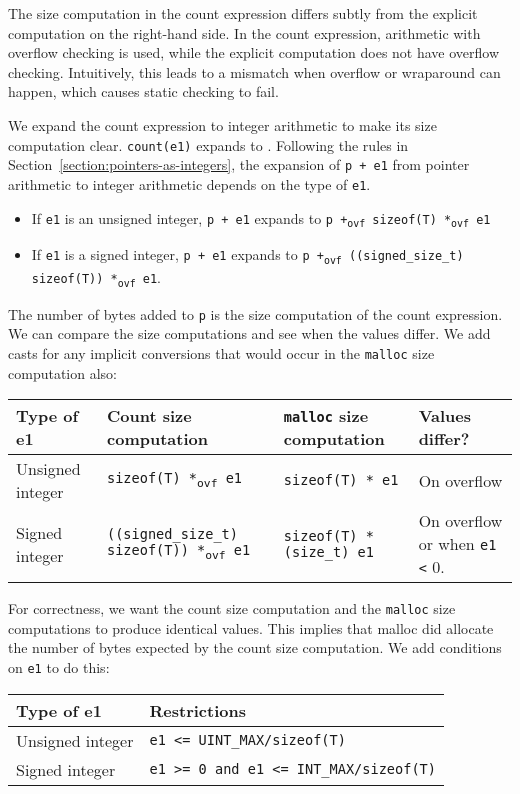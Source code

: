 The size computation in the count expression differs subtly from the
explicit computation on the right-hand side. In the count expression,
arithmetic with overflow checking is used, while the explicit
computation does not have overflow checking. Intuitively, this leads to
a mismatch when overflow or wraparound can happen, which causes static
checking to fail.

We expand the count expression to integer arithmetic to make its size
computation clear. \texttt{count(e1)} expands to . 
Following the rules in Section~\ref{section:pointers-as-integers},
the expansion of \texttt{p +
e1} from pointer arithmetic to integer arithmetic depends on the type of
\texttt{e1}.

\begin{itemize}
\item
  If \texttt{e1} is an unsigned integer, \texttt{p + e1} expands to
  \texttt{p +\textsubscript{ovf} sizeof(T) *\textsubscript{ovf} e1}
\item
  If \texttt{e1} is a signed integer, \texttt{p + e1} expands to
  \texttt{p +\textsubscript{ovf} ((signed\_size\_t) sizeof(T))
  *\textsubscript{ovf} e1}.
\end{itemize}

The number of bytes added to \texttt{p} is the size computation of the
count expression. We can compare the size computations and see when the
values differ. We add casts for any implicit conversions that would
occur in the \texttt{malloc} size computation also:

\begin{longtable}[c]{lp{1.75in}p{1.75in}p{1in}}
\toprule
Type of e1 & Count size computation & \texttt{malloc} size computation &
Values differ?\tabularnewline
\midrule
\endhead
Unsigned integer & \texttt{sizeof(T) *\textsubscript{ovf} e1} &
\texttt{sizeof(T) * e1} & On overflow\tabularnewline
Signed integer & \texttt{((signed\_size\_t) sizeof(T))
*\textsubscript{ovf} e1} & \texttt{sizeof(T) * (size\_t) e1} & On
overflow or when \texttt{e1 <} 0.\tabularnewline
\bottomrule
\end{longtable}

For correctness, we want the count size computation and the
\texttt{malloc} size computations to produce identical values. This
implies that malloc did allocate the number of bytes expected by the
count size computation. We add conditions on \texttt{e1} to do this:

\begin{longtable}[c]{ll}
\toprule
Type of e1 & Restrictions\tabularnewline
\midrule
\endhead
Unsigned integer & \texttt{e1 <= UINT\_MAX/sizeof(T)}\tabularnewline
Signed integer & \texttt{e1 >= 0 and e1 <= INT\_MAX/sizeof(T)}\tabularnewline
\bottomrule
\end{longtable}

